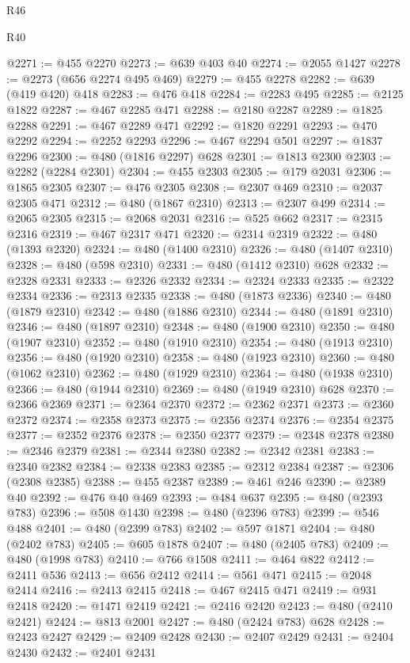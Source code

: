 \begin{lexlean}{R46}
\begin{lexlean}{R40}
\begin{coremodule}
{{{{{{{{{{{{{{{{{{{{{{{{{{{{{{{{{{{{{{{{{{{{{{{{{{{{{{{{{{{{{{{{{{{{{{{{{{{{{{{{{{{{{{{{{{{{{{{{{{{{{{{{{{{{{@2271 := @455 @2270
@2273 := @639 @403 @40
@2274 := @2055 @1427
@2278 := @2273 (@656 @2274 @495 @469)
@2279 := @455 @2278
@2282 := @639 (@419 @420) @418
@2283 := @476 @418
@2284 := @2283 @495
@2285 := @2125 @1822
@2287 := @467 @2285 @471
@2288 := @2180 @2287
@2289 := @1825 @2288
@2291 := @467 @2289 @471
@2292 := @1820 @2291
@2293 := @470 @2292
@2294 := @2252 @2293
@2296 := @467 @2294 @501
@2297 := @1837 @2296
@2300 := @480 (@1816 @2297) @628
@2301 := @1813 @2300
@2303 := @2282 (@2284 @2301)
@2304 := @455 @2303
@2305 := @179 @2031
@2306 := @1865 @2305
@2307 := @476 @2305
@2308 := @2307 @469
@2310 := @2037 @2305 @471
@2312 := @480 (@1867 @2310)
@2313 := @2307 @499
@2314 := @2065 @2305
@2315 := @2068 @2031
@2316 := @525 @662
@2317 := @2315 @2316
@2319 := @467 @2317 @471
@2320 := @2314 @2319
@2322 := @480 (@1393 @2320)
@2324 := @480 (@1400 @2310)
@2326 := @480 (@1407 @2310)
@2328 := @480 (@598 @2310)
@2331 := @480 (@1412 @2310) @628
@2332 := @2328 @2331
@2333 := @2326 @2332
@2334 := @2324 @2333
@2335 := @2322 @2334
@2336 := @2313 @2335
@2338 := @480 (@1873 @2336)
@2340 := @480 (@1879 @2310)
@2342 := @480 (@1886 @2310)
@2344 := @480 (@1891 @2310)
@2346 := @480 (@1897 @2310)
@2348 := @480 (@1900 @2310)
@2350 := @480 (@1907 @2310)
@2352 := @480 (@1910 @2310)
@2354 := @480 (@1913 @2310)
@2356 := @480 (@1920 @2310)
@2358 := @480 (@1923 @2310)
@2360 := @480 (@1062 @2310)
@2362 := @480 (@1929 @2310)
@2364 := @480 (@1938 @2310)
@2366 := @480 (@1944 @2310)
@2369 := @480 (@1949 @2310) @628
@2370 := @2366 @2369
@2371 := @2364 @2370
@2372 := @2362 @2371
@2373 := @2360 @2372
@2374 := @2358 @2373
@2375 := @2356 @2374
@2376 := @2354 @2375
@2377 := @2352 @2376
@2378 := @2350 @2377
@2379 := @2348 @2378
@2380 := @2346 @2379
@2381 := @2344 @2380
@2382 := @2342 @2381
@2383 := @2340 @2382
@2384 := @2338 @2383
@2385 := @2312 @2384
@2387 := @2306 (@2308 @2385)
@2388 := @455 @2387
@2389 := @461 @246
@2390 := @2389 @40
@2392 := @476 @40 @469
@2393 := @484 @637
@2395 := @480 (@2393 @783)
@2396 := @508 @1430
@2398 := @480 (@2396 @783)
@2399 := @546 @488
@2401 := @480 (@2399 @783)
@2402 := @597 @1871
@2404 := @480 (@2402 @783)
@2405 := @605 @1878
@2407 := @480 (@2405 @783)
@2409 := @480 (@1998 @783)
@2410 := @766 @1508
@2411 := @464 @822
@2412 := @2411 @536
@2413 := @656 @2412
@2414 := @561 @471
@2415 := @2048 @2414
@2416 := @2413 @2415
@2418 := @467 @2415 @471
@2419 := @931 @2418
@2420 := @1471 @2419
@2421 := @2416 @2420
@2423 := @480 (@2410 @2421)
@2424 := @813 @2001
@2427 := @480 (@2424 @783) @628
@2428 := @2423 @2427
@2429 := @2409 @2428
@2430 := @2407 @2429
@2431 := @2404 @2430
@2432 := @2401 @2431
}}}}}}}}}}}}}}}}}}}}}}}}}}}}}}}}}}}}}}}}}}}}}}}}}}}}}}}}}}}}}}}}}}}}}}}}}}}}}}}}}}}}}}}}}}}}}}}}}}}}}}}}}}}}}
\end{coremodule}
\end{lexlean}
\end{lexlean}
